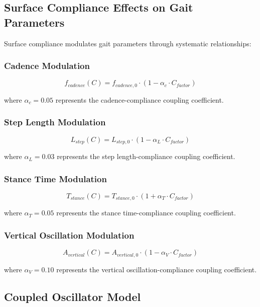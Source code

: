 \documentclass[12pt]{article}
\begin{document}
\subsection{Surface Compliance Effects on Gait Parameters}

Surface compliance modulates gait parameters through systematic relationships:

\subsubsection{Cadence Modulation}
\begin{equation}
f_{cadence}(C) = f_{cadence,0} \cdot (1 - \alpha_c \cdot C_{factor})
\end{equation}

where $\alpha_c = 0.05$ represents the cadence-compliance coupling coefficient.

\subsubsection{Step Length Modulation}
\begin{equation}
L_{step}(C) = L_{step,0} \cdot (1 - \alpha_L \cdot C_{factor})
\end{equation}

where $\alpha_L = 0.03$ represents the step length-compliance coupling coefficient.

\subsubsection{Stance Time Modulation}
\begin{equation}
T_{stance}(C) = T_{stance,0} \cdot (1 + \alpha_T \cdot C_{factor})
\end{equation}

where $\alpha_T = 0.05$ represents the stance time-compliance coupling coefficient.

\subsubsection{Vertical Oscillation Modulation}
\begin{equation}
A_{vertical}(C) = A_{vertical,0} \cdot (1 - \alpha_V \cdot C_{factor})
\end{equation}

where $\alpha_V = 0.10$ represents the vertical oscillation-compliance coupling coefficient.

\subsection{Coupled Oscillator Model}
\end{document}
